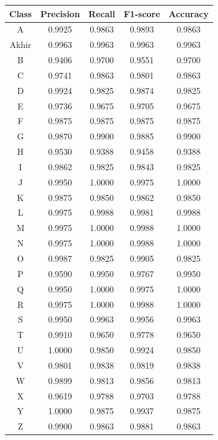 \begin{center}
	\begin{table}[!hbt]
	\centering
	\label{tbl:Tabel Confusion Matrix Xception}
	\begin{tabular}{|c|c|c|c|c|}
	\hline
	Class & Precision & Recall & F1-score & Accuracy \\
	\hline
	A & 0.9925 & 0.9863 & 0.9893 & 0.9863 \\
	Akhir & 0.9963 & 0.9963 & 0.9963 & 0.9963 \\
	B & 0.9406 & 0.9700 & 0.9551 & 0.9700 \\
	C & 0.9741 & 0.9863 & 0.9801 & 0.9863 \\
	D & 0.9924 & 0.9825 & 0.9874 & 0.9825 \\
	E & 0.9736 & 0.9675 & 0.9705 & 0.9675 \\
	F & 0.9875 & 0.9875 & 0.9875 & 0.9875 \\
	G & 0.9870 & 0.9900 & 0.9885 & 0.9900 \\
	H & 0.9530 & 0.9388 & 0.9458 & 0.9388 \\
	I & 0.9862 & 0.9825 & 0.9843 & 0.9825 \\
	J & 0.9950 & 1.0000 & 0.9975 & 1.0000 \\
	K & 0.9875 & 0.9850 & 0.9862 & 0.9850 \\
	L & 0.9975 & 0.9988 & 0.9981 & 0.9988 \\
	M & 0.9975 & 1.0000 & 0.9988 & 1.0000 \\
	N & 0.9975 & 1.0000 & 0.9988 & 1.0000 \\
	O & 0.9987 & 0.9825 & 0.9905 & 0.9825 \\
	P & 0.9590 & 0.9950 & 0.9767 & 0.9950 \\
	Q & 0.9950 & 1.0000 & 0.9975 & 1.0000 \\
	R & 0.9975 & 1.0000 & 0.9988 & 1.0000 \\
	S & 0.9950 & 0.9963 & 0.9956 & 0.9963 \\
	T & 0.9910 & 0.9650 & 0.9778 & 0.9650 \\
	U & 1.0000 & 0.9850 & 0.9924 & 0.9850 \\
	V & 0.9801 & 0.9838 & 0.9819 & 0.9838 \\
	W & 0.9899 & 0.9813 & 0.9856 & 0.9813 \\
	X & 0.9619 & 0.9788 & 0.9703 & 0.9788 \\
	Y & 1.0000 & 0.9875 & 0.9937 & 0.9875 \\
	Z & 0.9900 & 0.9863 & 0.9881 & 0.9863 \\
	\hline
	\end{tabular}
\end{table}
\end{center}

